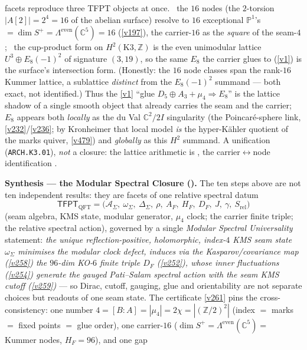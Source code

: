 \documentclass[11pt,a4paper]{article}
\newcommand{\Z}{\mathbb Z}
\begin{document}
\begin{keybox}
facets reproduce three TFPT objects at once. \mE\ the $16$ nodes (the $2$-torsion $|A[2]|{=}2^4{=}16$ of the
abelian surface) resolve to $16$ exceptional $\mathbb P^1$'s $=\dim S^+=\Lambda^{\mathrm{even}}(\mathbb
C^5)=16$ (\vref{v197}), the carrier-$16$ as the \emph{square} of the seam-$4$; \mE\ the cup-product form on
$H^2(\mathrm{K3},\Z)$ is the even unimodular lattice $U^3\oplus E_8({-}1)^2$ of signature $(3,19)$, so the
same $E_8$ the carrier glues to (\vref{v1}) is the surface's intersection form. (Honestly: the $16$ node
classes span the rank-$16$ Kummer lattice, a sublattice \emph{distinct} from the $E_8({-}1)^2$ summand ---
both exact, not identified.) Thus the \vref{v1} ``glue $D_5{\oplus}A_3{+}\mu_4{\Rightarrow}E_8$'' is the
lattice shadow of a single smooth object that already carries the seam and the carrier; $E_8$ appears both
\emph{locally} as the du Val $\mathbb C^2/2I$ singularity (the Poincar\'e-sphere link, \vref{v232}/\vref{v236};
by Kronheimer that local model \emph{is} the hyper-K\"ahler quotient of the marks quiver, \vref{v479})
and \emph{globally} as this $H^2$ summand. A unification (\texttt{ARCH.K3.01}), \emph{not} a closure: the
lattice arithmetic is \mE, the carrier$\leftrightarrow$node identification \mC.
\par\smallskip\noindent\textbf{Synthesis --- the Modular Spectral Closure ().}
The ten steps above are not ten independent results: they are facets of one relative spectral datum
\[
  \boxed{\ \mathsf{TFPT}_{\mathrm{QFT}}=\bigl(\mathcal A_\Sigma,\ \omega_\Sigma,\ \Delta_\Sigma,\ \rho,\
  A_F,\ H_F,\ D_F,\ J,\ \gamma,\ S_{\mathrm{rel}}\bigr)\ }
\]
(seam algebra, KMS state, modular generator, $\mu_4$ clock; the carrier finite triple; the relative
spectral action), governed by a single \emph{Modular Spectral Universality} statement: \emph{the unique
reflection-positive, holomorphic, index-$4$ KMS seam state $\omega_\Sigma$ minimises the modular clock
defect, induces via the Kasparov/covariance map (\vref{v258}) the $96$-dim KO-$6$ finite triple $D_F$
(\vref{v252}), whose inner fluctuations (\vref{v254}) generate the gauged Pati--Salam spectral action with
the seam KMS cutoff (\vref{v259})} --- so Dirac, cutoff, gauging, glue and orientability are not separate
choices but readouts of one seam state. The certificate \vref{v261} pins the cross-consistency: one number
$4=[B{:}A]=|\mu_4|=2\chi=|(\Z/2)^2|$ (index $=$ marks $=$ fixed points $=$ glue order), one carrier-$16$
($\dim S^+=\Lambda^{\mathrm{even}}(\mathbb C^5)=$ Kummer nodes, $H_F=96$), and one gap

\end{keybox}
\end{document}
